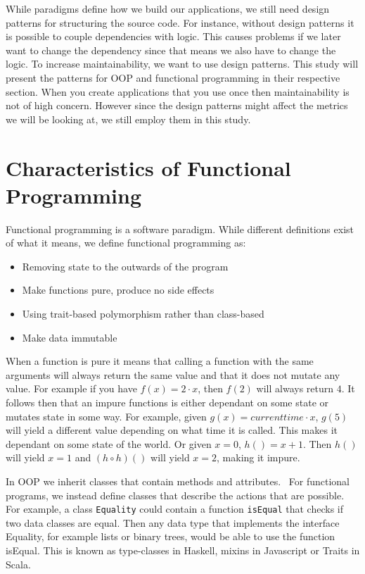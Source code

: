 \documentclass[12pt]{report}
\theoremstyle{definition}
\theoremstyle{theorem}
\begin{document}
While paradigms define how we build our applications, we still need design
patterns for structuring the source code. For instance, without design patterns
it is possible to couple dependencies with logic. This causes problems if we
later want to change the dependency since that means we also have to change the
logic. To increase maintainability, we want to use design patterns.  This
study will present the patterns for OOP and functional programming in their
respective section. When you create applications that you use once then
maintainability is not of high concern. However since the design patterns might
affect the metrics we will be looking at, we still employ them in this study.  

\section{Characteristics of Functional Programming}

Functional programming is a software paradigm. While different definitions exist
of what it means, we define functional programming as:

\begin{itemize}
    \item Removing state to the outwards of the program
    \item Make functions pure, produce no side effects
    \item Using trait-based polymorphism rather than class-based
    \item Make data immutable
\end{itemize}

When a function is pure it means that calling a function with the same arguments
will always return the same value and that it does not mutate any value. For
example if you have $f(x) = 2\cdot x$, then $f(2)$ will always return $4$. It
follows then that an impure functions is either dependant on some state or
mutates state in some way. For example, given $g(x) = currenttime \cdot x$,
$g(5)$ will yield a different value depending on what time it is called. This
makes it dependant on some state of the world. Or given $x=0$, $h()=x+1$. Then
$h()$ will yield $x=1$ and $(h \circ h)()$ will yield $x=2$, making it
impure.~\cite{wikipedia_pure}

In OOP we inherit classes that contain methods and
attributes.~\cite{Gamma:1995:DPE:186897} For functional programs, we instead
define classes that describe the actions that are possible. For example, a class
\texttt{Equality} could contain a function \texttt{isEqual} that checks if two
data classes are equal. Then any data type that implements the interface
Equality, for example lists or binary trees, would be able to use the function
isEqual. This is known as type-classes in Haskell, mixins in Javascript or
Traits in Scala.
\end{document}

